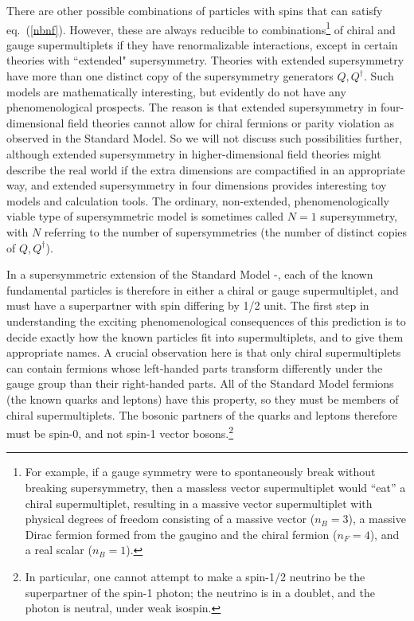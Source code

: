 \documentclass[12pt]{article}
\newcommand{\dagg}[1]{#1^\dagger}
\begin{document}
There are other possible combinations of particles with spins that can 
satisfy eq.~(\ref{nbnf}). However, these are always reducible to 
combinations\footnote{For example, if a gauge symmetry were to 
spontaneously break without breaking supersymmetry, then a massless vector 
supermultiplet would ``eat'' a chiral supermultiplet, resulting in a 
massive vector supermultiplet with physical degrees of freedom consisting 
of a massive vector ($n_B=3$), a massive Dirac fermion formed from the 
gaugino and the chiral fermion ($n_F=4$), and a real scalar ($n_B=1$).} of 
chiral and gauge supermultiplets if they have renormalizable interactions, 
except in certain theories with ``extended" supersymmetry. Theories with 
extended supersymmetry have more than one distinct copy of the 
supersymmetry generators $Q,\dagg{Q}$. Such models are mathematically 
interesting, but evidently do not have any phenomenological prospects. The 
reason is that extended supersymmetry in four-dimensional field theories 
cannot allow for chiral fermions or parity violation as observed in the 
Standard Model. So we will not discuss such possibilities further, 
although extended supersymmetry in higher-dimensional field theories might 
describe the real world if the extra dimensions are compactified in an 
appropriate way, and extended supersymmetry in four dimensions provides 
interesting toy models and calculation tools. 
The ordinary, non-extended, phenomenologically 
viable type of supersymmetric model is sometimes called $N=1$ 
supersymmetry, with $N$ referring to the number of supersymmetries (the 
number of distinct copies of $Q, \dagg{Q}$).

In a supersymmetric extension of the Standard Model 
\cite{FayetHsnu}-\cite{Rparity}, 
each of the known fundamental 
particles is therefore in either a chiral or gauge supermultiplet, and 
must have a superpartner with spin differing by 1/2 unit. The first step 
in understanding the exciting phenomenological consequences of this 
prediction is to decide exactly how the known particles fit into 
supermultiplets, and to give them appropriate names. A crucial observation 
here is that only chiral supermultiplets can contain fermions whose 
left-handed parts transform differently under the gauge group than their 
right-handed parts. All of the Standard Model fermions (the known quarks 
and leptons) have this property, so they must be members of chiral 
supermultiplets. The bosonic partners of the quarks and leptons therefore must
be spin-0, and not spin-1 vector bosons.\footnote{In particular, one cannot attempt to make a 
spin-1/2 neutrino be the superpartner of the spin-1 photon; the neutrino 
is in a doublet, and the photon is neutral, under weak isospin.} 
\end{document}
